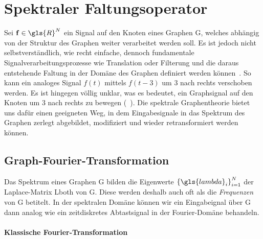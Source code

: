 \section{Spektraler Faltungsoperator}
\label{spektraler_faltungsoperator}

Sei $\ve{f} \in \gls{R}^N$ ein Signal auf den Knoten eines Graphen \gls{G}, welches abhängig von der Struktur des Graphen weiter verarbeitet werden soll.
Es ist jedoch nicht selbstverständlich, wie recht einfache, dennoch fundamentale Signalverarbeitungsprozesse wie Translation oder Filterung und die daraus entstehende Faltung in der Domäne des Graphen definiert werden können~\cite{Shuman}.
So kann \zB{} ein analoges Signal $f\left(t\right)$ mittels $f\left(t-3\right)$ um $3$ nach rechts verschoben werden.
Es ist hingegen völlig unklar, was es bedeutet, ein Graphsignal auf den Knoten um $3$ nach rechts zu bewegen (\vgl{}~\cite{Shuman}).
Die spektrale Graphentheorie bietet uns dafür einen geeigneten Weg, in dem Eingabesignale in das Spektrum des Graphen zerlegt \bzw{} abgebildet, modifiziert und wieder retransformiert werden können.

\subsection{Graph-Fourier-Transformation}
\label{graph_fourier_transformation}

Das Spektrum eines Graphen \gls{G} bilden die Eigenwerte ${\left\{\gls{lambda}_i\right\}}_{i=1}^N$ der Laplace-Matrix \gls{Lboth} von \gls{G}.
Diese werden deshalb auch oft als die \emph{Frequenzen} von \gls{G} betitelt.
In der spektralen Domäne können wir ein Eingabeignal  über \gls{G} dann analog wie ein zeitdiskretes Abtastsignal in der Fourier-Domäne behandeln.

\paragraph{Klassische Fourier-Transformation}
\label{klassische_fourier_transformation}

